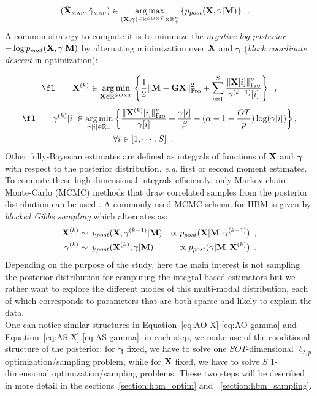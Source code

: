 \begin{eqnarray}
(\xMAP,\gamMAP) & \in \argmax_{(\bfX,\mathbf{\gamma}) \in\R^{SO \times T} \times \R^{n}_+} \left\lbrace \hipost \right\rbrace \enspace.%
\end{eqnarray}
A common strategy  to compute it is to minimize the \emph{negative log posterior} $-\log p_{post}(\mathbf{X},\gamma|\mathbf{M})$ by alternating  minimization over $\mathbf{X}$ and $\mathbf{\gamma}$ (\emph{block coordinate descent} in optimization):

\begin{equation}\label{eq:AO-X}
\fl \qquad  \bfX^{(k)} \in \argmin_{\bfX\in\R^{SO \times T}} \left\lbrace \frac{1}{2} \fronormsq{\bfM - \bfG \bfX} + \sum_{i=1}^S  \frac{\fronorm{\bfX[i]}^p}{\mathbf{\gamma}^{(k-1)}[i]} \right\rbrace \enspace,
\end{equation}
\begin{equation}\label{eq:AO-gamma}
\begin{split}
\fl \qquad \mathbf{\gamma}^{(k)}[i] \in \argmin_{\mathbf{\gamma}[i]\in \R_+} & \left\lbrace\frac{\fronorm{\bfX^{(k)}[i]}^p }{\mathbf{\gamma}[i]} + \frac{\mathbf{\gamma}[i]}{\beta} - (\alpha - 1 - \frac{OT}{p}) \log(\mathbf{\gamma}[i]) \right\rbrace, \\
& \forall i\in [1,\cdots, S] \enspace. 
\end{split}
\end{equation}
Other fully-Bayesian estimates are defined as integrals of functions of $\mathbf{X}$ and $\mathbf{\gamma}$ with respect to the posterior distribution, \textit{e.g.} first or second moment estimates. To compute these high dimensional integrals efficiently, only Markov chain Monte-Carlo (MCMC) methods that draw correlated samples from the posterior distribution can be used\cite{RoCa05,KaSo05} . A commonly used MCMC scheme for HBM is given by \emph{blocked Gibbs sampling} which alternates as:
\begin{eqnarray}
\mathbf{X}^{(k)} &\sim \: p_{post}(\mathbf{X},\mathbf{\gamma}^{(k-1)}|\mathbf{M}) &\propto p_{post}(\mathbf{X}|\mathbf{M},\mathbf{\gamma}^{(k-1)}) \enspace, \label{eq:AS-X}\\
\mathbf{\gamma}^{(k)} &\sim \: p_{post}(\mathbf{X}^{(k)},\mathbf{\gamma}|\mathbf{M}) &\propto p_{post}(\mathbf{\gamma}|\mathbf{M},\mathbf{X}^{(k)})\enspace. \label{eq:AS-gamma}
\end{eqnarray}
Depending on the purpose of the study, here the main interest is not sampling the posterior distribution for computing the integral-based estimators but we rather want to explore the different modes of this multi-modal distribution, each of which corresponds to parameters that are both sparse and likely to explain the data.\\
One can notice similar structures in Equation~\eqref{eq:AO-X}-\eqref{eq:AO-gamma} and Equation~\eqref{eq:AS-X}-\eqref{eq:AS-gamma}: in each step, we make use of the conditional structure of the posterior: for $\mathbf{\gamma}$ fixed, we have to solve one $SOT$-dimensional $\ell_{2,p}$ optimization/sampling problem, while for $\mathbf{X}$ fixed, we have to solve $S$ 1-dimensional optimization/sampling problems. These two steps will be described in more detail in the sections~\ref{section:hbm_optim} and~ \ref{section:hbm_sampling}.

